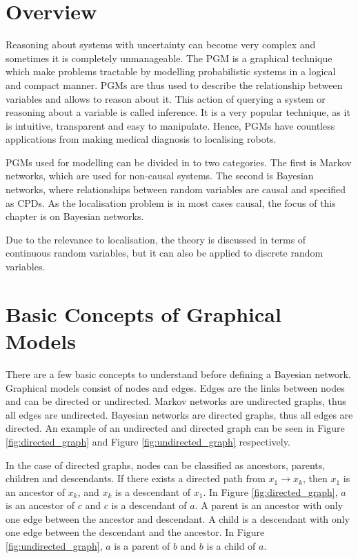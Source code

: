 \documentclass[12pt,oneside,openany,a4paper, %
afrikaans,english,
]{memoir}
\numberwithin{equation}{chapter}
\begin{document}
\section{Overview}
Reasoning about systems with uncertainty can become very complex and sometimes it is completely unmanageable. The PGM is a graphical technique which make problems tractable by modelling probabilistic systems in a logical and compact manner. PGMs are thus used to describe the relationship between variables and allows to reason about it. This action of querying a system or reasoning about a variable is called inference. It is a very popular technique, as it is intuitive, transparent and easy to manipulate. Hence, PGMs have countless applications from making medical diagnosis to localising robots.

PGMs used for modelling can be divided in to two categories. The first is Markov networks, which are used for non-causal systems. The second is Bayesian networks, where relationships between random variables are causal and specified as CPDs. As the localisation problem is in most cases causal, the focus of this chapter is on Bayesian networks.

Due to the relevance to localisation, the theory is discussed in terms of continuous random variables, but it can also be applied to discrete random variables. 
\section{Basic Concepts of Graphical Models}
There are a few basic concepts to understand before defining a Bayesian network. Graphical models consist of nodes and edges. Edges are the links between nodes and can be directed or undirected. Markov networks are undirected graphs, thus all edges are undirected. Bayesian networks are directed graphs, thus all edges are directed. An example of an undirected and directed graph can be seen in Figure \ref{fig:directed_graph} and Figure \ref{fig:undirected_graph} respectively.

In the case of directed graphs, nodes can be classified as ancestors, parents, children and descendants. If there exists a directed path from $x_1 \to x_k$, then $x_1$ is an ancestor of $x_k$, and $x_k$ is a descendant of $x_1$. In Figure \ref{fig:directed_graph}, $a$ is an ancestor of $c$ and $c$ is a descendant of $a$. A parent is an ancestor with only one edge between the ancestor and descendant. A child is a descendant with only one edge between the descendant and the ancestor. In Figure \ref{fig:undirected_graph}, $a$ is a parent of $b$ and $b$ is a child of $a$.~\cite{barber}
\end{document}
